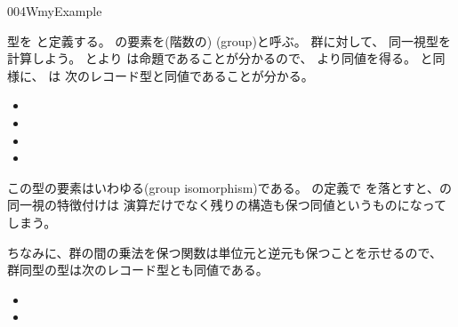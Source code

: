 \documentclass[index]{subfiles}
\begin{document}
\begin{myBlock}{004W}{myExample}
\begin{itemize}
  \end{itemize}
  型を
  と定義する。
  の要素を(階数の)
  (group)と呼ぶ。
  群に対して、
  同一視型を計算しよう。
  とより
  は命題であることが分かるので、
  より同値を得る。
  と同様に、
  は
  次のレコード型と同値であることが分かる。
  \begin{itemize}
  \item {}
  \item {}
  \item {}
  \item {}
  \end{itemize}
  この型の要素はいわゆる(group isomorphism)である。
  の定義で
  を落とすと、の同一視の特徴付けは
  演算だけでなく残りの構造も保つ同値というものになってしまう。

  ちなみに、群の間の乗法を保つ関数は単位元と逆元も保つことを示せるので、
  群同型の型は次のレコード型とも同値である。
  \begin{itemize}
  \item {}
  \item {}
  \end{itemize}
\end{myBlock}
\end{document}
